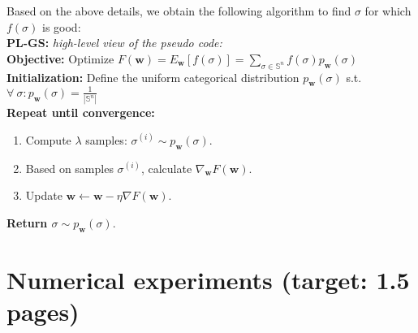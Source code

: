 \documentclass[a4paper,10pt]{article}
\newcommand{\ReplaceMe}[1]{{\color{blue}#1}}
\newcommand{\RemoveMe}[1]{{\color{purple}#1}}
\begin{document}
%
	
	Based on the above details, we obtain the following algorithm to find $\sigma$ for which $f(\sigma)$ is good:\\
	\textbf{PL-GS:} \textit{high-level view of the pseudo code:} \\
	\textbf{Objective:} Optimize $F(\mathbf{w}) = E_\mathbf{w}[f(\sigma)] = \sum_{\sigma \in \mathbb{S}^n} f(\sigma) p_\mathbf{w}(\sigma)$ \\	
	\textbf{Initialization:} Define the uniform categorical distribution $p_\mathbf{w}(\sigma)$ s.t. $\forall~\sigma: p_\mathbf{w}(\sigma)=\frac{1}{|\mathbb{S}^n|}$ \\	
	\textbf{Repeat until convergence:}
	\begin{enumerate}
		\item Compute $\lambda$ samples: $\sigma^{(i)} \sim p_\mathbf{w}(\sigma)$.
		\item Based on samples $\sigma^{(i)}$, calculate $\nabla_{\mathbf{w}} F\left(\mathbf{w}\right)$.
		\item Update $\mathbf{w} \leftarrow \mathbf{w} - \eta \nabla F\left(\mathbf{w}\right)$.
	\end{enumerate}
	\textbf{Return $\sigma \sim p_\mathbf{w}(\sigma)$}.

\section{Numerical experiments (target: 1.5 pages)}
\end{document}
